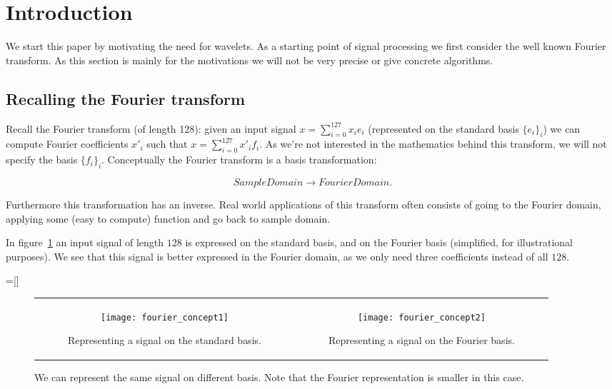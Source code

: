 
\section{Introduction}
\label{sec:intro}
We start this paper by motivating the need for wavelets. As a starting point of signal processing we first consider the well known Fourier transform. As this section is mainly for the motivations we will not be very precise or give concrete algorithms.

\subsection{Recalling the Fourier transform}
Recall the Fourier transform (of length 128): given an input signal $x = \sum_{i=0}^{127} x_i e_i$ (represented on the standard basis $\{e_i\}_i$) we can compute Fourier coefficients $x'_i$ such that $x = \sum_{i=0}^{127} x'_i f_i$. As we're not interested in the mathematics behind this transform, we will not specify the basis $\{f_i\}_i$. Conceptually the Fourier transform is a basis transformation:

$$ SampleDomain \to FourierDomain. $$

Furthermore this transformation has an inverse. Real world applications of this transform often consists of going to the Fourier domain, applying some (easy to compute) function and go back to sample domain.

In figure~\ref{fig:fourier_concepts} an input signal of length $128$ is expressed on the standard basis, and on the Fourier basis (simplified, for illustrational purposes). We see that this signal is better expressed in the Fourier domain, as we only need three coefficients instead of all $128$.

=[]
\begin{figure}
	\begin{tabular}{c|c}
	\begin{subfigure}[b]{0.5\textwidth}
		\centering
		\texttt{[image: fourier\_concept1]}
		\caption{Representing a signal on the standard basis.}
	\end{subfigure}&
	\begin{subfigure}[b]{0.5\textwidth}
		\centering
		\texttt{[image: fourier\_concept2]}
		\caption{Representing a signal on the Fourier basis.}
	\end{subfigure}
	\end{tabular}
	\caption{We can represent the same signal on different basis. Note that the Fourier representation is smaller in this case.}
	\label{fig:fourier_concepts}
\end{figure}

